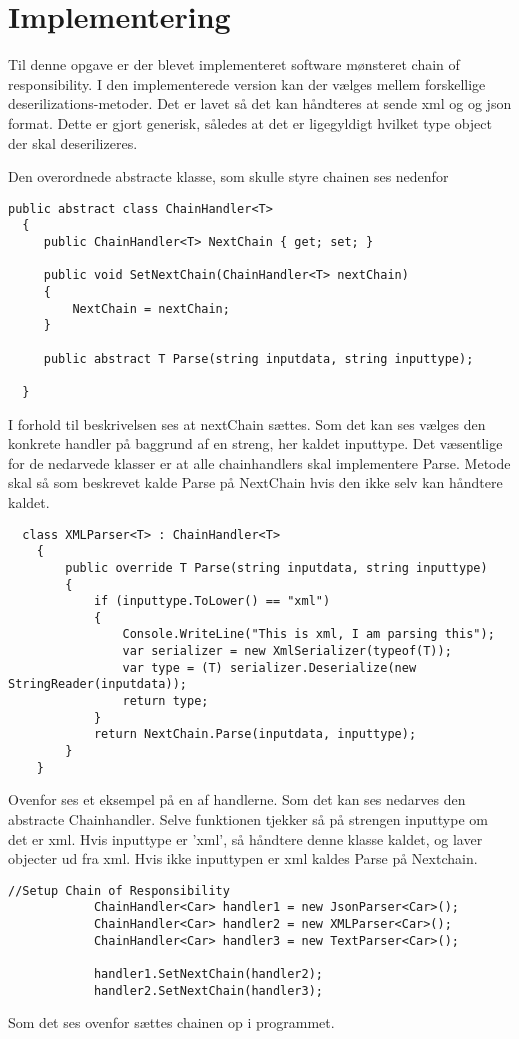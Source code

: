 \chapter{Implementering}

Til denne opgave er der blevet implementeret software mønsteret chain of responsibility. I den implementerede version kan der vælges mellem forskellige deserilizations-metoder. Det er lavet så det kan håndteres at sende xml og og json format. Dette er gjort generisk, således at det er ligegyldigt hvilket type object der skal deserilizeres. 

Den overordnede abstracte klasse, som skulle styre chainen ses nedenfor

\begin{lstlisting}
public abstract class ChainHandler<T>
  {
     public ChainHandler<T> NextChain { get; set; }

     public void SetNextChain(ChainHandler<T> nextChain)
     {
         NextChain = nextChain;
     }

     public abstract T Parse(string inputdata, string inputtype);

  }
\end{lstlisting}  

I forhold til beskrivelsen ses at nextChain sættes. Som det kan ses vælges den konkrete handler på baggrund af en streng, her kaldet inputtype. Det væsentlige for de nedarvede klasser er at alle chainhandlers skal implementere Parse. Metode skal så som beskrevet kalde Parse på NextChain hvis den ikke selv kan håndtere kaldet.

\begin{lstlisting}
  class XMLParser<T> : ChainHandler<T>
    {
        public override T Parse(string inputdata, string inputtype)
        {
            if (inputtype.ToLower() == "xml")
            {
                Console.WriteLine("This is xml, I am parsing this");
                var serializer = new XmlSerializer(typeof(T));
                var type = (T) serializer.Deserialize(new StringReader(inputdata));
                return type;
            }
            return NextChain.Parse(inputdata, inputtype);
        }
    }
\end{lstlisting} 

Ovenfor ses et eksempel på en af handlerne. Som det kan ses nedarves den abstracte Chainhandler. Selve funktionen tjekker så på strengen inputtype om det er xml. Hvis inputtype er 'xml', så håndtere denne klasse kaldet, og laver objecter ud fra xml. Hvis ikke inputtypen er xml kaldes Parse på Nextchain. 

\begin{lstlisting}
//Setup Chain of Responsibility
            ChainHandler<Car> handler1 = new JsonParser<Car>();
            ChainHandler<Car> handler2 = new XMLParser<Car>();
            ChainHandler<Car> handler3 = new TextParser<Car>();

            handler1.SetNextChain(handler2);
            handler2.SetNextChain(handler3);
\end{lstlisting} 
   
Som det ses ovenfor sættes chainen op i programmet. 


